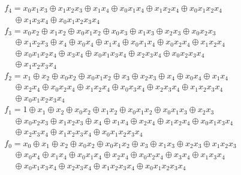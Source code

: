 \documentclass[twocolumn]{IEEEtran} \usepackage{epsfig}
\begin{document}
\[
\begin{array}{l}
f_4 = x_0 x_1 x_3 \oplus x_1 x_2 x_3 \oplus x_1 x_4 \oplus x_0 x_1 x_4 \oplus x_1 x_2 x_4 \oplus x_0 x_1 x_2 x_4\\ ~~~~~ \oplus x_1 x_3 x_4 \oplus x_0 x_1 x_2 x_3 x_4 \\

f_3 = x_0 x_2 \oplus x_1 x_2 \oplus x_0 x_1 x_2 \oplus x_0 x_3 \oplus x_1 x_3 \oplus x_2 x_3 \oplus x_0 x_2 x_3\\ ~~~~~ \oplus x_1 x_2 x_3 \oplus x_4 \oplus x_0 x_4 \oplus x_1 x_4 \oplus x_0 x_1 x_4 \oplus x_0 x_2 x_4 \oplus x_1 x_2 x_4\\
~~~~~  \oplus x_0 x_1 x_2 x_4 \oplus x_3 x_4 \oplus x_0 x_1 x_3 x_4 \oplus x_2 x_3 x_4 \oplus x_0 x_2 x_3 x_4\\ ~~~~~ \oplus x_1 x_2 x_3 x_4 \\

f_2 = x_1 \oplus x_2 \oplus x_0 x_2 \oplus x_0 x_1 x_2 \oplus x_3 \oplus x_2 x_3 \oplus x_4 \oplus x_0 x_4 \oplus x_1 x_4\\
~~~~~  \oplus x_2 x_4 \oplus x_0 x_2 x_4 \oplus x_1 x_2 x_4 \oplus x_0 x_3 x_4 \oplus x_2 x_3 x_4 \oplus x_1 x_2 x_3 x_4\\
~~~~~  \oplus x_0 x_1 x_2 x_3 x_4 \\

f_1 = 1 \oplus x_1 \oplus x_2 \oplus x_0 x_2 \oplus x_1 x_2 \oplus x_0 x_1 x_2 \oplus x_0 x_1 x_3 \oplus x_2 x_3\\
~~~~~  \oplus x_0 x_2 x_3 \oplus x_1 x_2 x_3 \oplus x_4 \oplus x_1 x_4 \oplus x_2 x_4 \oplus x_1 x_2 x_4 \oplus x_0 x_1 x_3 x_4\\
~~~~~  \oplus x_2 x_3 x_4 \oplus x_1 x_2 x_3 x_4 \oplus x_0 x_1 x_2 x_3 x_4 \\

f_0 = x_0 \oplus x_1 \oplus x_2 \oplus x_0 x_2 \oplus x_0 x_1 x_2 \oplus x_3 \oplus x_1 x_3 \oplus x_2 x_3 \oplus x_1 x_2 x_3\\
~~~~~  \oplus x_0 x_4 \oplus x_1 x_4 \oplus x_0 x_1 x_4 \oplus x_2 x_4 \oplus x_0 x_2 x_4 \oplus x_3 x_4 \oplus x_1 x_3 x_4\\
~~~~~  \oplus x_0 x_1 x_3 x_4 \oplus x_2 x_3 x_4 \oplus x_1 x_2 x_3 x_4 \oplus x_0 x_1 x_2 x_3 x_4 
\end{array}
\]
\end{document}
